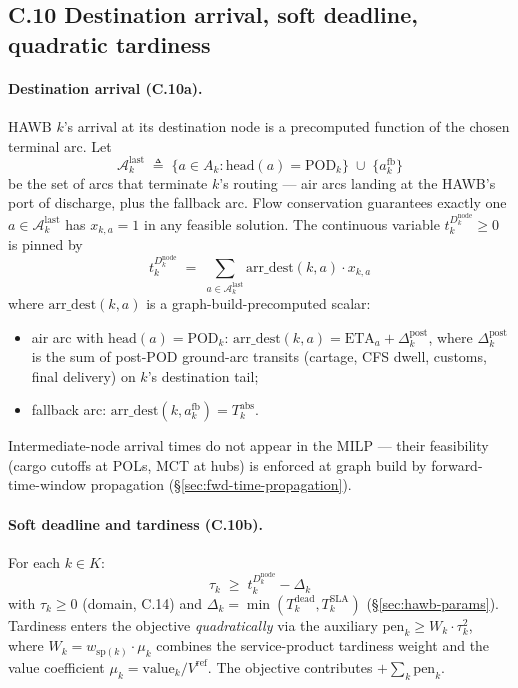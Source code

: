 \documentclass[11pt,a4paper]{article}
\newcommand{\defeq}{\triangleq}
\theoremstyle{definition}
\begin{document}
\subsection*{C.10 Destination arrival, soft deadline, quadratic tardiness}

\paragraph{Destination arrival (C.10a).}
HAWB $k$'s arrival at its destination node is a precomputed function of the
chosen terminal arc. Let
\[
  \mathcal{A}^{\text{last}}_k \;\defeq\; \{a \in A_k : \text{head}(a) =
    \text{POD}_k\} \;\cup\; \{a^{\text{fb}}_k\}
\]
be the set of arcs that terminate $k$'s routing --- air arcs landing at the
HAWB's port of discharge, plus the fallback arc. Flow conservation
guarantees exactly one $a \in \mathcal{A}^{\text{last}}_k$ has $x_{k,a} = 1$
in any feasible solution. The continuous variable $t_k^{D_k^{\text{node}}}
\geq 0$ is pinned by
\begin{equation}
  t_k^{D_k^{\text{node}}} \;=\;
    \sum_{a \in \mathcal{A}^{\text{last}}_k} \text{arr\_dest}(k, a) \cdot x_{k,a}
  \label{eq:C10a}
\end{equation}
where $\text{arr\_dest}(k, a)$ is a graph-build-precomputed scalar:
\begin{itemize}[noitemsep]
  \item air arc with $\text{head}(a) = \text{POD}_k$: $\text{arr\_dest}(k, a)
        = \text{ETA}_a + \Delta^{\text{post}}_k$, where $\Delta^{\text{post}}_k$
        is the sum of post-POD ground-arc transits (cartage, CFS dwell,
        customs, final delivery) on $k$'s destination tail;
  \item fallback arc: $\text{arr\_dest}(k, a^{\text{fb}}_k) = T_k^{\text{abs}}$.
\end{itemize}
Intermediate-node arrival times do not appear in the MILP --- their
feasibility (cargo cutoffs at POLs, MCT at hubs) is enforced at graph build
by forward-time-window propagation (\S\ref{sec:fwd-time-propagation}).

\paragraph{Soft deadline and tardiness (C.10b).}
For each $k \in K$:
\begin{equation}
  \tau_k \;\geq\; t_k^{D_k^{\text{node}}} - \Delta_k
  \label{eq:C10b}
\end{equation}
with $\tau_k \geq 0$ (domain, C.14) and $\Delta_k = \min(T_k^{\text{dead}},
T_k^{\text{SLA}})$ (\S\ref{sec:hawb-params}). Tardiness enters the objective
\emph{quadratically} via the auxiliary $\text{pen}_k \geq W_k \cdot \tau_k^2$,
where $W_k = w_{\text{sp}(k)} \cdot \mu_k$ combines the service-product
tardiness weight and the value coefficient $\mu_k = \text{value}_k /
V^{\text{ref}}$. The objective contributes $+ \sum_k \text{pen}_k$.
\end{document}
